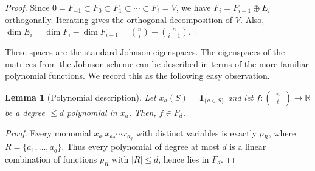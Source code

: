 \documentclass
[11pt,letterpaper]
{article}
\providecommand*{\R}{\mathbb R}
\newtheorem{lemma}[theorem]{Lemma}
\newcommand{\one}{\mathbf 1}
\begin{document}
\begin{proof}
Since $0=F_{-1}\subset F_0\subset F_1\subset\cdots\subset F_\ell=V$,
we have $F_i=F_{i-1}\oplus E_i$
orthogonally. Iterating gives the orthogonal decomposition of \(V\). Also, $\dim E_i
=
\dim F_i-\dim F_{i-1}
=
\binom ni-\binom n{i-1}$.
\end{proof}

These spaces are the standard Johnson eigenspaces.
The eigenspaces of the matrices from the Johnson scheme can be described in terms of the more familiar polynomial functions. We record this as the following easy observation.  
\begin{lemma}[Polynomial description] \label{lem:poly-description}
Let \(x_a(S)=\one_{\{a\in S\}}\) and let $f:{[n] \choose \ell} \rightarrow \R$ be a degree $\leq d$ polynomial in $x_{a}$. Then, $f \in F_d$. 
\end{lemma}

\begin{proof}
Every monomial $x_{a_1}x_{a_2}\cdots x_{a_q}$
with distinct variables is exactly \(p_R\), where $R=\{a_1,\dots,a_q\}$.
Thus every polynomial of degree at most \(d\) is a linear combination of functions \(p_R\) with \(|R|\le d\), hence lies in \(F_d\).
\end{proof}
\end{document}
